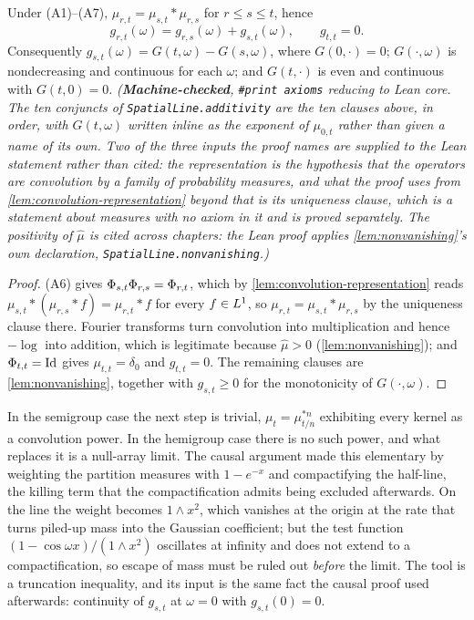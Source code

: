 \begin{lemma}[additivity]\label{lem:additivity}
\leanok
{}
Under (A1)--(A7), $\mu_{r,t} = \mu_{s,t} * \mu_{r,s}$ for $r \le s \le t$, hence
\[
  g_{r,t}(\omega) = g_{r,s}(\omega) + g_{s,t}(\omega), \qquad g_{t,t} = 0 .
\]
Consequently $g_{s,t}(\omega) = G(t,\omega) - G(s,\omega)$, where $G(0,\cdot) = 0$;
$G(\cdot,\omega)$ is nondecreasing and continuous for each $\omega$; and $G(t,\cdot)$ is even
and continuous with $G(t,0) = 0$.
\statusT\quad\emph{(\textbf{Machine-checked}, \texttt{\#print axioms} reducing to Lean core.
The ten conjuncts of \texttt{SpatialLine.additivity} are the ten clauses above, in order, with
$G(t,\omega)$ written inline as the exponent of $\mu_{0,t}$ rather than given a name of its
own. Two of the three inputs the proof names are supplied to the Lean statement rather than
cited: the representation is the hypothesis that the operators are convolution by a family of
probability measures, and what the proof uses from \ref{lem:convolution-representation} beyond
that is its \emph{uniqueness} clause, which is a statement about measures with no axiom in it
and is proved separately. The positivity of $\hat\mu$ is cited across chapters: the Lean proof
applies \ref{lem:nonvanishing}'s own declaration, \texttt{SpatialLine.nonvanishing}.)}
\end{lemma}

\begin{proof}
\leanok
(A6) gives $\Phi_{s,t}\Phi_{r,s} = \Phi_{r,t}$, which by
\ref{lem:convolution-representation} reads $\mu_{s,t} * (\mu_{r,s} * f) = \mu_{r,t} * f$ for
every $f \in L^1$, so $\mu_{r,t} = \mu_{s,t} * \mu_{r,s}$ by the uniqueness clause there.
Fourier transforms turn convolution into multiplication and hence $-\log$ into addition, which
is legitimate because $\hat\mu > 0$ (\ref{lem:nonvanishing}); and $\Phi_{t,t} = \mathrm{Id}$
gives $\mu_{t,t} = \delta_0$ and $g_{t,t} = 0$. The remaining clauses are
\ref{lem:nonvanishing}, together with $g_{s,t} \ge 0$ for the monotonicity of
$G(\cdot,\omega)$.
\end{proof}

In the semigroup case the next step is trivial, $\mu_t = \mu_{t/n}^{*n}$ exhibiting every
kernel as a convolution power. In the hemigroup case there is no such power, and what replaces
it is a null-array limit. The causal argument made this elementary by weighting the partition
measures with $1 - e^{-x}$ and compactifying the half-line, the killing term that the
compactification admits being excluded afterwards. On the line the weight becomes
$1 \wedge x^2$, which vanishes at the origin at the rate that turns piled-up mass into the
Gaussian coefficient; but the test function $(1 - \cos\omega x)/(1 \wedge x^2)$ oscillates at
infinity and does not extend to a compactification, so escape of mass must be ruled out
\emph{before} the limit. The tool is a truncation inequality, and its input is the same fact
the causal proof used afterwards: continuity of $g_{s,t}$ at $\omega = 0$ with
$g_{s,t}(0) = 0$.

